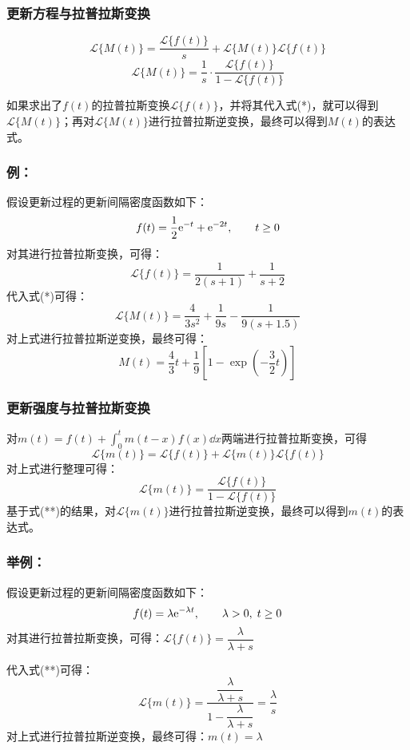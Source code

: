 \documentclass[t]{beamer}
\newcommand{\laplace}[2]{\mathcal{L}\{#1(#2)\}}
\begin{document}
\begin{frame}
  \frametitle{更新方程与拉普拉斯变换}
\[ \laplace{M}{t}=\frac{\laplace{f}{t}}{s}+\laplace{M}{t}\laplace{f}{t} \]
\begin{equation}
  \laplace{M}{t}=\frac{1}{s}\cdot \frac{\laplace{f}{t}}{1-\laplace{f}{t}}\tag{*}
\end{equation}
  
  如果求出了$f(t)$的拉普拉斯变换$\laplace{f}{t}$，并将其代入式(*)，就可以得到$\laplace{M}{t}$；再对$\laplace{M}{t}$进行拉普拉斯逆变换，最终可以得到$M(t)$的表达式。
\end{frame}


\begin{frame}
  \frametitle{例：}
  假设更新过程的更新间隔密度函数如下：
  \[f(t)=\frac{1}{2}{\rm e}^{-t}+{\rm e}^{-2t},\qquad t\ge 0\]
  对其进行拉普拉斯变换，可得：
  \[\laplace{f}{t}=\frac{1}{2(s+1)}+\frac{1}{s+2}\]
  代入式(*)可得：
  \[\laplace{M}{t}=\frac{4}{3s^2}+\frac{1}{9s}-\frac{1}{9(s+1.5)}\]
  对上式进行拉普拉斯逆变换，最终可得：
  \[M(t)=\frac{4}{3}t+\frac{1}{9}\left[1-\exp\left(-\frac{3}{2}t\right)\right]\]
\end{frame}



\begin{frame}
  \frametitle{更新强度与拉普拉斯变换}
对$m(t)=f(t)+\int^t_0 m(t-x)f(x)\dd x$两端进行拉普拉斯变换，可得
\[  \laplace{m}{t}=\laplace{f}{t}+\laplace{m}{t}\laplace{f}{t}\]
对上式进行整理可得：
\begin{equation}
  \laplace{m}{t}=\frac{\laplace{f}{t}}{1-\laplace{f}{t}}\tag{**}
\end{equation}
基于式(**)的结果，对$\laplace{m}{t}$进行拉普拉斯逆变换，最终可以得到$m (t)$的表达式。
\end{frame}


\begin{frame}
  \frametitle{举例：}
  假设更新过程的更新间隔密度函数如下：
  \[f(t)=\lambda {\rm e}^{-\lambda t},\qquad \lambda>0,\; t\ge 0\]
  对其进行拉普拉斯变换，可得：$\laplace{f}{t}=\dfrac{\lambda}{\lambda+s}$

  代入式(**)可得：
  \[\laplace{m}{t}=\frac{\dfrac{\lambda}{\lambda+s}}{1-\dfrac{\lambda}{\lambda+s}}=\frac{\lambda}{s}\]
  对上式进行拉普拉斯逆变换，最终可得：$m(t)=\lambda$

\end{frame}
\end{document}
